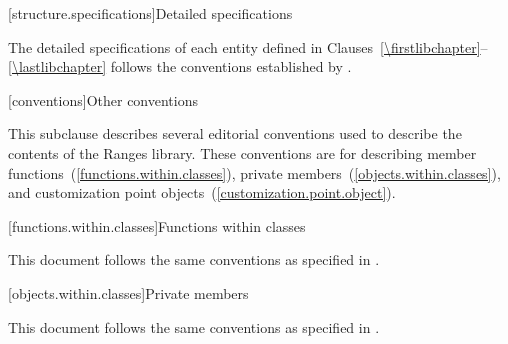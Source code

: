 [structure.specifications]{Detailed specifications}

\pnum
The detailed specifications of each entity defined in
Clauses~\ref{\firstlibchapter}--\ref{\lastlibchapter} follows the conventions
established by .

[conventions]{Other conventions}
%

\pnum
This subclause describes several editorial conventions used to describe the contents
of the Ranges library. These conventions are for describing
member functions~(\ref{functions.within.classes}),
private members~(\ref{objects.within.classes}),
and customization point objects~(\ref{customization.point.object}).

[functions.within.classes]{Functions within classes}

\pnum
This document follows the same conventions as specified in .

[objects.within.classes]{Private members}

\pnum
This document follows the same conventions as specified in .

